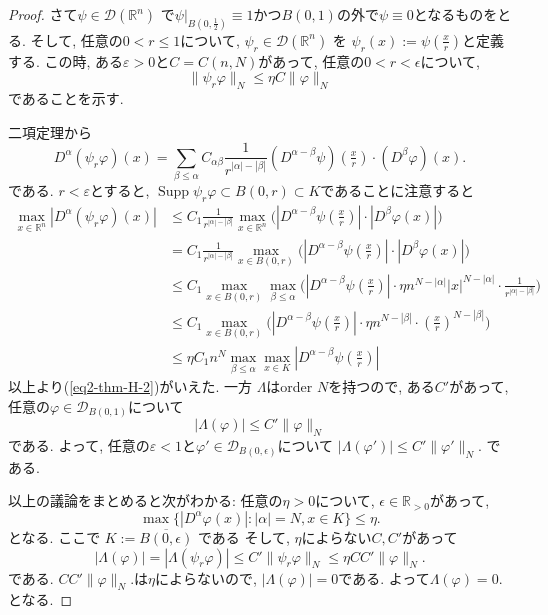 \documentclass[dvipdfmx,a4paper,11pt]{article} %
\theoremstyle{definition}
\theoremstyle{remark}
\numberwithin{equation}{section}
\begin{document}
\begin{proof}
さて\(\psi \in \mathcal{D}(\mathbb{R}^n)\) 
で\(\psi|_{B(0,\tfrac{1}{2})} \equiv 1\)かつ\(B(0,1)\)の外で\(\psi \equiv 0\)となるものをとる. 
そして, 任意の\(0 <  r \le 1\)について, \(\psi_r \in \mathcal{D}(\mathbb{R}^n)\) を
\(\psi_r(x) := \psi(\tfrac{x}{r})\)と定義する. 
この時, ある$\varepsilon>0$と$C=C(n,N)$があって, 任意の\(0 <  r < \epsilon\)について,  
\begin{equation}
\label{eq2-thm-H-2}
\|\psi_r \varphi\|_N \le \eta C \|\varphi\|_N 
\end{equation}
であることを示す. 

二項定理から
\[
D^\alpha(\psi_r \varphi)(x) 
= \sum_{\beta \le \alpha} C_{\alpha \beta} 
\frac{1}{r^{|\alpha|-|\beta|}} (D^{\alpha-\beta}\psi)(\tfrac{x}{r}) \cdot (D^\beta \varphi)(x).
\]
である. 
$r < \varepsilon$とすると, $\operatorname{Supp} \psi_r \varphi  \subset B(0,r) \subset K$であることに注意すると
\begin{align*}
\max_{x \in \mathbb{R}^n} |D^\alpha (\psi_r \varphi)(x)|
&\le 
C_1 \frac{1}{r^{|\alpha|-|\beta|}} \max_{x \in \mathbb{R}^n} 
\Big(|D^{\alpha-\beta}\psi(\tfrac{x}{r})| \cdot |D^\beta \varphi(x)|\Big)\\
&= 
C_1 \frac{1}{r^{|\alpha|-|\beta|}} 
\max_{x \in B(0,r)} \Big(|D^{\alpha-\beta}\psi(\tfrac{x}{r})| \cdot |D^\beta \varphi(x)|\Big)\\
&\le 
C_1 \max_{x \in B(0,r)} \max_{\beta \le \alpha} 
\Big( |D^{\alpha-\beta}\psi(\tfrac{x}{r})| 
\cdot \eta n^{N-|\alpha|} |x|^{N-|\alpha|} \cdot \frac{1}{r^{|\alpha|-|\beta|}} \Big) \\
&\le 
C_1 \max_{x \in B(0,r)}
\Big( |D^{\alpha-\beta}\psi(\tfrac{x}{r})| 
\cdot \eta n^{N-|\beta|} \cdot  (\tfrac{x}{r})^{N-|\beta|}\Big) \\
&\le 
\eta C_1 n^N \max_{\beta \le \alpha} \max_{x \in K}  |D^{\alpha-\beta}\psi(\tfrac{x}{r})| 
\end{align*}
以上より(\ref{eq2-thm-H-2})がいえた.
一方 \(\Lambda\)はorder \(N\)を持つので, ある\(C'\)があって, 
任意の$\varphi \in \mathcal{D}_{B(0,1)}$について
\[
|\Lambda(\varphi)| \le C' \|\varphi\|_N 
\]
である. よって, 任意の$\varepsilon <1$と\(\varphi' \in \mathcal{D}_{B(0,\epsilon)}\)について
\(|\Lambda(\varphi')| \le C' \|\varphi'\|_N\).  
である. 

以上の議論をまとめると次がわかる:
任意の$\eta>0$について, 
\( \epsilon \in \mathbb{R}_{>0}\)があって, 
\[
\max \{ |D^\alpha \varphi(x)| : |\alpha|=N, x \in K \} \le \eta.
\]
となる. ここで  \(K:=\overline{B(0,\epsilon)}\) である
そして, $\eta$によらない$C, C'$があって
\[
|\Lambda(\varphi)| = |\Lambda(\psi_r \varphi)| 
\le C' \|\psi_r \varphi\|_N \le \eta CC' \|\varphi\|_N.
\]
である. $CC' \|\varphi\|_N.$は$\eta$によらないので, 
\(|\Lambda(\varphi)| = 0\)である. よって\(\Lambda(\varphi) = 0.\)  となる.
\end{proof}
\end{document}
